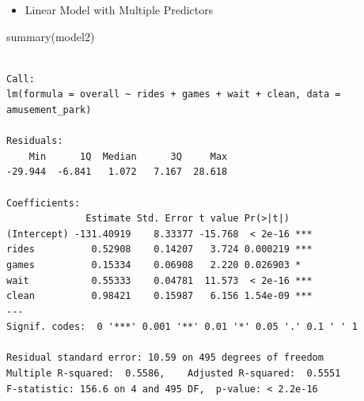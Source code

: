 \documentclass[
  ignorenonframetext,
]{beamer}
\newenvironment{Shaded}{\begin{snugshade}}{\end{snugshade}}
\newcommand{\FunctionTok}[1]{\textcolor[rgb]{0.28,0.35,0.67}{#1}}
\newcommand{\NormalTok}[1]{\textcolor[rgb]{0.00,0.23,0.31}{#1}}
\providecommand{\tightlist}{%
  \setlength{\itemsep}{0pt}\setlength{\parskip}{0pt}}\usepackage{longtable,booktabs,array}
\begin{document}
\begin{frame}[fragile]{}
\label{section-20}
\begin{itemize}
\tightlist
\item
  Linear Model with Multiple Predictors
\end{itemize}

\tiny

\begin{Shaded}
\begin{Highlighting}[]
\FunctionTok{summary}\NormalTok{(model2)}
\end{Highlighting}
\end{Shaded}

\begin{verbatim}

Call:
lm(formula = overall ~ rides + games + wait + clean, data = amusement_park)

Residuals:
    Min      1Q  Median      3Q     Max 
-29.944  -6.841   1.072   7.167  28.618 

Coefficients:
              Estimate Std. Error t value Pr(>|t|)    
(Intercept) -131.40919    8.33377 -15.768  < 2e-16 ***
rides          0.52908    0.14207   3.724 0.000219 ***
games          0.15334    0.06908   2.220 0.026903 *  
wait           0.55333    0.04781  11.573  < 2e-16 ***
clean          0.98421    0.15987   6.156 1.54e-09 ***
---
Signif. codes:  0 '***' 0.001 '**' 0.01 '*' 0.05 '.' 0.1 ' ' 1

Residual standard error: 10.59 on 495 degrees of freedom
Multiple R-squared:  0.5586,    Adjusted R-squared:  0.5551 
F-statistic: 156.6 on 4 and 495 DF,  p-value: < 2.2e-16
\end{verbatim}
\end{frame}
\end{document}
